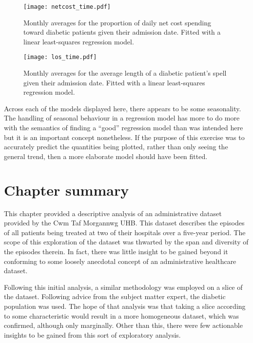 \begin{figure}
    \centering
    \texttt{[image: netcost\_time.pdf]}
    \caption{Monthly averages for the proportion of daily net cost spending
        toward diabetic patients given their admission date. Fitted with a
        linear least-squares regression model.}%
    \label{fig:netcost_proportions}
\end{figure}

\begin{figure}
    \centering
    \texttt{[image: los\_time.pdf]}
    \caption{Monthly averages for the average length of a diabetic patient's
        spell given their admission date. Fitted with a linear least-squares
        regression model.}%
    \label{fig:los_time}
\end{figure}

Across each of the models displayed here, there appears to be some seasonality.
The handling of seasonal behaviour in a regression model has more to do more
with the semantics of finding a ``good'' regression model than was intended here
but it is an important concept nonetheless. If the purpose of this exercise was
to accurately predict the quantities being plotted, rather than only seeing the
general trend, then a more elaborate model should have been fitted.


\section{Chapter summary}\label{sec:summary}

This chapter provided a descriptive analysis of an administrative dataset
provided by the Cwm Taf Morgannwg UHB. This dataset describes the episodes of
all patients being treated at two of their hospitals over a five-year period.
The scope of this exploration of the dataset was thwarted by the span and
diversity of the episodes therein. In fact, there was little insight to be
gained beyond it conforming to some loosely anecdotal concept of an
administrative healthcare dataset.

Following this initial analysis, a similar methodology was employed on a slice
of the dataset. Following advice from the subject matter expert, the diabetic
population was used. The hope of that analysis was that taking a slice according
to some characteristic would result in a more homogeneous dataset, which was
confirmed, although only marginally. Other than this, there were few actionable
insights to be gained from this sort of exploratory analysis.

